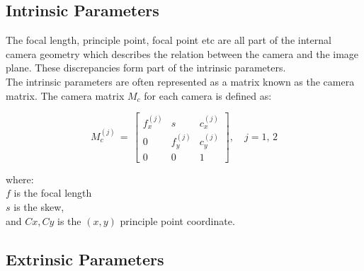%
%


\subsection{Intrinsic Parameters}
\label{sec:intrinsic}

The focal length, principle point, focal point etc are all part of the internal camera geometry which describes the relation between the camera and the image plane. These discrepancies form part of the intrinsic parameters.\\

The intrinsic parameters are often represented as a matrix known as the camera matrix. The camera matrix $M_c$ for each camera is defined as:

\begin{equation}\label{eq:cm}
M_c^{(j)}\,=\,\begin{bmatrix}
{f_x^{(j)}} & {s} & {c_x^{(j)}}\\
{0} & {f_y^{(j)}} & {c_y^{(j)}}\\
{0} & {0} & {1}
\end{bmatrix},\quad j = 1,\, 2
\end{equation}

where:\\
$f$ is the focal length\\
$s$ is the skew,\\
and $Cx, Cy$ is the $(x,y)$ principle point coordinate.

\subsection{Extrinsic Parameters}

